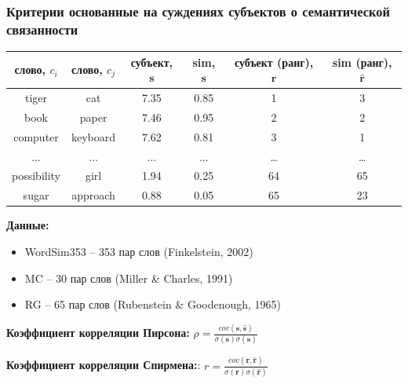 \documentclass{beamer}
\begin{document}
\begin{frame}
\frametitle{Критерии основанные на суждениях субъектов о семантической связанности}

\begin{table}[h]\footnotesize
\begin{tabular}{ |c|c|c|c|c|c| }
\hline
  слово, $c_i$ & слово, $c_j$ & субъект, $\mathbf{s}$  & sim, $\mathbf{s}$  & субъект (ранг), $\mathbf{r}$ & sim (ранг), $\hat{\mathbf{r}}$  \\ \hline \hline
tiger & cat & 7.35 & 0.85 & 1 & 3 \\
book & paper & 7.46 &  0.95 & 2 & 2 \\
computer & keyboard & 7.62 &  0.81 & 3 & 1 \\
... & ... & ... & ...   & \ldots & \ldots \\
possibility & girl & 1.94 & 0.25 & 64 & 65 \\
sugar & approach & 0.88 & 0.05 & 65 & 23 \\ \hline
\end{tabular}
\end{table}


\textbf{Данные:}

\begin{itemize}
	\item WordSim353 -- 353 пар слов (Finkelstein, 2002)  
	\item MC -- 30 пар слов  (Miller & Charles, 1991)
	\item RG -- 65 пар слов (Rubenstein & Goodenough, 1965)  
\end{itemize}

\textbf{Коэффициент корреляции Пирсона:}  $\rho = \frac{cov(\mathbf{s},\hat{\mathbf{s}})}{\sigma(\mathbf{s}) \sigma(\hat{\mathbf{s}})}$

 \textbf{Коэффициент корреляции Спирмена:}: $r = \frac{cov(\mathbf{r},\hat{\mathbf{r}})}{\sigma(\mathbf{r}) \sigma(\hat{\mathbf{r}})}$
 
\end{frame}
\end{document}
